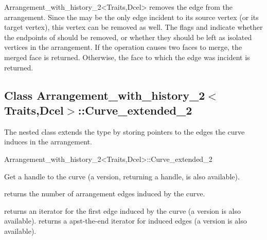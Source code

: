 \begin{ccRefClass}{Arrangement_with_history_2<Traits,Dcel>}
  {removes the edge  from the arrangement. Since the  may
   be the only edge incident to its source vertex (or its target vertex),
   this vertex can be removed as well. The flags  and
    indicate whether the endpoints of  should be
   removed, or whether they should be left as isolated vertices in the
   arrangement.
   If the operation causes two faces to merge, the merged face is returned.
   Otherwise, the face to which the edge was incident is returned.}

\subsection*{Class 
        Arrangement\_with\_history\_2$<$Traits,Dcel$>$::Curve\_extended\_2}

The  nested class extends the  type
by storing pointers to the edges the curve induces in the arrangement.

\begin{ccClass}{Arrangement_with_history_2<Traits,Dcel>::Curve_extended_2}

\ccTypes

\ccGlue
{}


\ccAccessFunctions

  {Get a handle to the curve (a  version, returning a 
   handle, is also available).}

  {returns the number of arrangement edges induced by the curve.}

  {returns an iterator for the first edge induced by the curve
   (a  version is also available).}
\ccGlue
{}
  {returns a apst-the-end iterator for induced edges
   (a  version is also available).}


\end{ccClass}
\end{ccRefClass}
